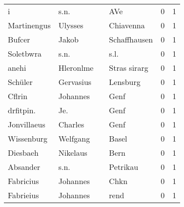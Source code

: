 \begin{tabular}{llllrr}
                        i &                               s.n. &             &                                         AVe &          0 &         1 \\
              Martinengus &                            Ulysses &             &                                   Chiavenna &          0 &         1 \\
                   Bufcer &                              Jakob &             &                                Schaffhausen &          0 &         1 \\
                Soletbwra &                               s.n. &             &                                        s.l. &          0 &         1 \\
                    anehi &                          Hleronlme &             &                                Stras sirarg &          0 &         1 \\
                  Schüler &                          Gervasius &             &                                    Lensburg &          0 &         1 \\
                   Cflrin &                           Johannes &             &                                        Genf &          0 &         1 \\
                drfitpin. &                                Je. &             &                                        Genf &          0 &         1 \\
              Jonvillaeus &                            Charles &             &                                        Genf &          0 &         1 \\
               Wissenburg &                           Welfgang &             &                                       Basel &          0 &         1 \\
                 Diesbaeh &                           Nikelaus &             &                                        Bern &          0 &         1 \\
                 Absander &                               s.n. &             &                                    Petrikau &          0 &         1 \\
                Fabricius &                           Johannes &             &                                        Chkn &          0 &         1 \\
                Fabrieius &                           Johannes &             &                                        rend &          0 &         1 \\

\end{tabular}
